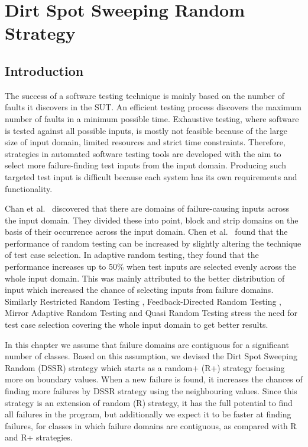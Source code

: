 
\chapter{Dirt Spot Sweeping Random Strategy}
\label{chap:DSSR}




\section{Introduction}\label{sec:intro4}
The success of a software testing technique is mainly based on the number of faults it discovers in the SUT. An efficient testing process discovers the maximum number of faults in a minimum possible time. Exhaustive testing, where software is tested against all possible inputs, is mostly not feasible because of the large size of input domain, limited resources and strict time constraints. Therefore, strategies in automated software testing tools are developed with the aim to select more failure-finding test inputs from the input domain. Producing such targeted test input is difficult because each system has its own requirements and functionality.

Chan et al.~\cite{chan1996proportional} discovered that there are domains of failure-causing inputs across the input domain. They divided these into point, block and strip domains on the basis of their occurrence across the input domain. Chen et al.~\cite{chen2005adaptive} found that the performance of random testing can be increased by slightly altering the technique of test case selection. In adaptive random testing, they found that the performance increases up to 50\% when test inputs are selected evenly across the whole input domain. This was mainly attributed to the better distribution of input which increased the chance of selecting inputs from failure domains. Similarly Restricted Random Testing \cite{chan2003normalized}, Feedback-Directed Random Testing \cite{pacheco2007randoop}, Mirror Adaptive Random Testing \cite{chen2004mirror} and Quasi Random Testing \cite{chen2007quasi} stress the need for test case selection covering the whole input domain to get better results.

In this chapter we assume that failure domains are contiguous for a significant number of classes. Based on this assumption, we devised the Dirt Spot Sweeping %
Random (DSSR) strategy  which starts as a random+ (R+) strategy focusing more on boundary values. When a new failure is found, it increases the chances of finding more failures by DSSR strategy using the neighbouring values. Since this strategy is an extension of random (R) strategy, it has the full potential to find all failures in the program, but additionally we expect it to be faster at finding failures, for classes in which failure domains are contiguous, as compared with R and R+ strategies.

